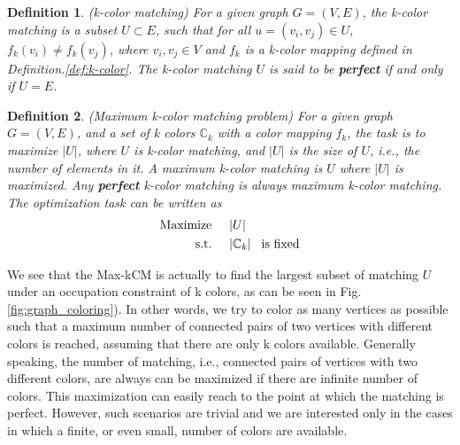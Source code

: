 \documentclass[%
 reprint,
nofootinbib,
 amsmath,amssymb,
 aps,
pra,
floatfix,
]{revtex4-2}
\newtheorem{definition}{Definition}
\begin{document}
\begin{definition}
\label{def:k-color-matching}
{\rm (k-color matching)}
For a given graph $G=(V,E)$, the k-color matching is a subset $U \subset E$, such that for all $u=(v_i,v_j) \in {U}$, $f_k(v_i) \neq f_k(v_j)$, where $v_i,v_j \in V$ and $f_k$ is a k-color mapping defined in {\rm Definition.\ref{def:k-color}}. The k-color matching $U$ is said to be {\rm\textbf{perfect}} if and only if $U=E$.
\end{definition}
\begin{definition}
\label{def:maximum-k-color-matching-problem}
{\rm (Maximum k-color matching problem)} For a given graph $G=(V,E)$, and a set of k colors $\mathbb{C}_k$ with a color mapping $f_k$, the task is to maximize $|U|$, where $U$ is k-color matching, and $|U|$ is the size of $U$, i.e., the number of elements in it. A maximum k-color matching is $U$ where $|U|$ is maximized. Any {\rm \textbf{perfect}} k-color matching is always maximum k-color matching. The optimization task can be written as
\begin{align}\label{eq-max-kcm}
\text{\rm Maximize} \hspace{5mm} &|U|  \nonumber \\
\text{\rm s.t.} \hspace{5mm} &|\mathbb{C}_k| \hspace{3mm} \text{\rm is fixed}   
\end{align}
\end{definition}
We see that the Max-kCM is actually to find the largest subset of matching $U$ under an occupation constraint of k colors, as can be seen in Fig.\ref{fig:graph_coloring}). In other words, we try to color as many vertices as possible such that a maximum number of connected pairs of two vertices with different colors is reached, assuming that there are only k colors available. Generally speaking, the number of matching, i.e., connected pairs of vertices with two different colors, are always can be maximized if there are infinite number of colors. This maximization can easily reach to the point at which the matching is perfect. However, such scenarios are trivial and we are interested only in the cases in which a finite, or even small, number of colors are available.\\
\end{document}
